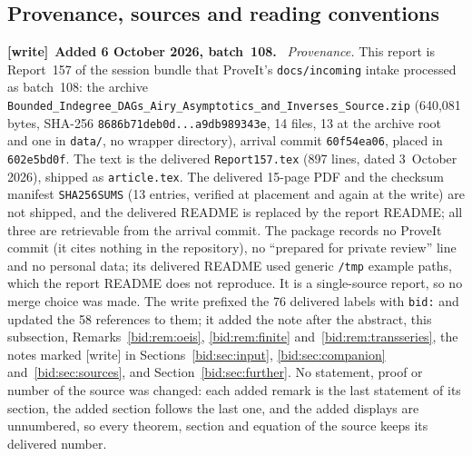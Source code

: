 \documentclass[11pt,letterpaper]{article}
\numberwithin{equation}{section}
\theoremstyle{remark}\newtheorem{remark}[theorem]{Remark}
\newcommand{\file}[1]{\nolinkurl{#1}}
\newenvironment{writenote}[1][]{\par\smallskip\begingroup\small
 \noindent\textbf{[write]}\if\relax\detokenize{#1}\relax\else~\textbf{#1.}\fi\ }%
 {\par\endgroup\smallskip}
\begin{document}
\subsection{Provenance, sources and reading conventions}\label{bid:sec:provenance}
\begin{writenote}[Added 6 October 2026, batch~108]
\emph{Provenance.} This report is Report~157 of the session bundle that
ProveIt's \file{docs/incoming} intake processed as batch~108: the archive
\file{Bounded_Indegree_DAGs_Airy_Asymptotics_and_Inverses_Source.zip}
(640{,}081 bytes, SHA-256 \file{8686b71deb0d...a9db989343e}, 14 files, 13 at
the archive root and one in \file{data/}, no wrapper directory), arrival
commit \file{60f54ea06}, placed in \file{602e5bd0f}. The text is the
delivered \file{Report157.tex} (897 lines, dated 3~October 2026), shipped as
\file{article.tex}. The delivered 15-page PDF and the checksum manifest
\file{SHA256SUMS} (13 entries, verified at placement and again at the write)
are not shipped, and the delivered README is replaced by the report README;
all three are retrievable from the arrival commit. The package records no
ProveIt commit (it cites nothing in the repository), no ``prepared for private
review'' line and no personal data; its delivered README used generic
\file{/tmp} example paths, which the report README does not reproduce. It is
a single-source report, so no merge choice was made. The write prefixed the
76 delivered labels with \file{bid:} and updated the 58 references to them;
it added the note after the abstract, this subsection,
Remarks~\ref{bid:rem:oeis}, \ref{bid:rem:finite}
and~\ref{bid:rem:transseries}, the notes marked [write] in
Sections~\ref{bid:sec:input}, \ref{bid:sec:companion}
and~\ref{bid:sec:sources}, and Section~\ref{bid:sec:further}. No statement,
proof or number of the source was changed: each added remark is the last
statement of its section, the added section follows the last one, and the
added displays are unnumbered, so every theorem, section and equation of the
source keeps its delivered number.


\end{writenote}
\end{document}
